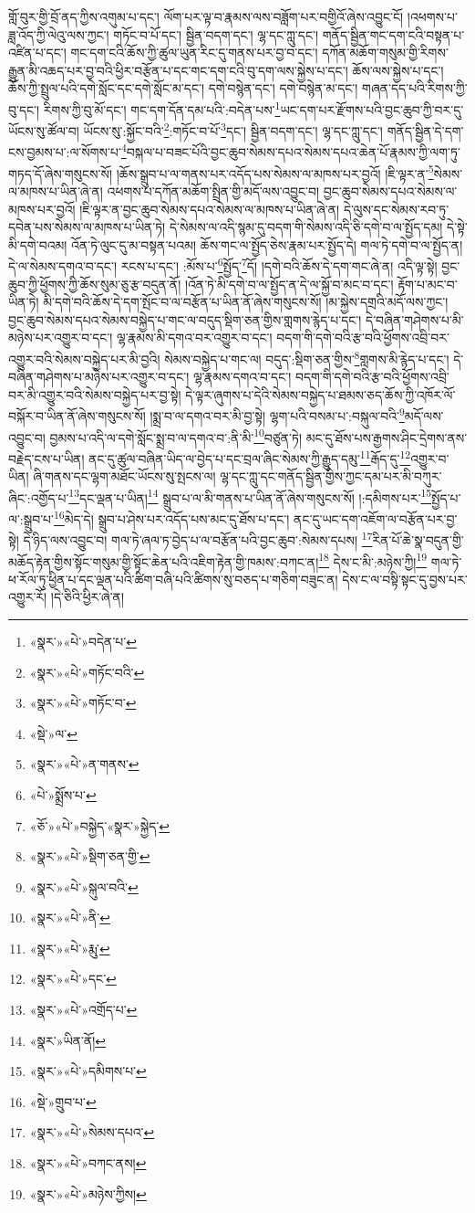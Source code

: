 གློ་བུར་གྱི་བྲོ་ནད་ཀྱིས་འགུམ་པ་དང་། ལོག་པར་ལྟ་བ་རྣམས་ལས་བཟློག་པར་བགྱིའོ་ཞེས་འབྱུང་ངོ། །འཕགས་པ་ཟླ་འོད་ཀྱི་ལེའུ་ལས་ཀྱང་། གཏོང་བ་པོ་དང་། སྦྱིན་བདག་དང་། ལྷ་དང་ཀླུ་དང་། གནོད་སྦྱིན་གང་དག་ངའི་བསྟན་པ་འཛིན་པ་དང་། གང་དག་ངའི་ཆོས་ཀྱི་ཚུལ་ཡུན་རིང་དུ་གནས་པར་བྱ་བ་དང་། དཀོན་མཆོག་གསུམ་གྱི་རིགས་རྒྱུན་མི་འཆད་པར་བྱ་བའི་ཕྱིར་བརྩོན་པ་དང་གང་དག་ངའི་བུ་དག་ལས་སྐྱེས་པ་དང་། ཆོས་ལས་སྐྱེས་པ་དང་། ཆོས་ཀྱི་སྤྲུལ་པའི་དགེ་སློང་དང་དགེ་སློང་མ་དང་། དགེ་བསྙེན་དང་། དགེ་བསྙེན་མ་དང་། གཞན་དད་པའི་རིགས་ཀྱི་བུ་དང་། རིགས་ཀྱི་བུ་མོ་དང་། གང་དག་དོན་དམ་པའི་:བདེན་པས་\footnote{«སྣར་»«པེ་»བདེན་པ་}ཡང་དག་པར་རྫོགས་པའི་བྱང་ཆུབ་ཀྱི་བར་དུ་ཡོངས་སུ་ཚོལ་བ། ཡོངས་སུ་:སྐྱོང་བའི་\footnote{«སྣར་»«པེ་»གཏོང་བའི་}:གཏོང་བ་པོ་\footnote{«སྣར་»«པེ་»གཏོང་བ་}དང་། སྦྱིན་བདག་དང་། ལྷ་དང་ཀླུ་དང་། གནོད་སྦྱིན་དེ་དག་ངས་བྱམས་པ་:ལ་སོགས་པ་\footnote{«སྡེ་»ལ་}བསྐལ་པ་བཟང་པོའི་བྱང་ཆུབ་སེམས་དཔའ་སེམས་དཔའ་ཆེན་པོ་རྣམས་ཀྱི་ལག་ཏུ་གཏད་དོ་ཞེས་གསུངས་སོ། །ཆོས་སྒྲུབ་པ་ལ་གནས་པར་འདོད་པས་སེམས་ལ་མཁས་པར་བྱའོ། །ཇི་ལྟར་ན་\footnote{«སྣར་»«པེ་»ན་གནས་}སེམས་ལ་མཁས་པ་ཡིན་ཞེ་ན། འཕགས་པ་དཀོན་མཆོག་སྤྲིན་གྱི་མདོ་ལས་འབྱུང་བ། བྱང་ཆུབ་སེམས་དཔའ་སེམས་ལ་མཁས་པར་བྱའོ། །ཇི་ལྟར་ན་བྱང་ཆུབ་སེམས་དཔའ་སེམས་ལ་མཁས་པ་ཡིན་ཞེ་ན། དེ་ལུས་དང་སེམས་རབ་ཏུ་དབེན་པས་སེམས་ལ་མཁས་པ་ཡིན་ཏེ། དེ་སེམས་ལ་འདི་སྙམ་དུ་བདག་གི་སེམས་འདི་ཅི་དགེ་བ་ལ་སྤྱོད་དམ། དེ་སྟེ་མི་དགེ་བའམ། འོན་ཏེ་ལུང་དུ་མ་བསྟན་པའམ། ཆོས་གང་ལ་སྤྱོད་ཅེས་རྣམ་པར་སྤྱོད་དེ། གལ་ཏེ་དགེ་བ་ལ་སྤྱོད་ན། དེ་ལ་སེམས་དགའ་བ་དང་། རངས་པ་དང་། :མོས་པ་\footnote{«པེ་»སྨྲོས་པ་}སྤྱོད་\footnote{«ཅོ་»«པེ་»བསྐྱེད་«སྣར་»སྐྱེད་}དོ། །དགེ་བའི་ཆོས་དེ་དག་གང་ཞེ་ན། འདི་ལྟ་སྟེ། བྱང་ཆུབ་ཀྱི་ཕྱོགས་ཀྱི་ཆོས་སུམ་ཅུ་རྩ་བདུན་ནོ། །འོན་ཏེ་མི་དགེ་བ་ལ་སྤྱོད་ན་དེ་ལ་སྐྱོ་བ་མང་བ་དང་། རྟོག་པ་མང་བ་ཡིན་ཏེ། མི་དགེ་བའི་ཆོས་དེ་དག་སྤོང་བ་ལ་བརྩོན་པ་ཡིན་ནོ་ཞེས་གསུངས་སོ། །མ་སྐྱེས་དགྲའི་མདོ་ལས་ཀྱང་། བྱང་ཆུབ་སེམས་དཔའ་སེམས་བསྐྱེད་པ་གང་ལ་བདུད་སྡིག་ཅན་གྱིས་གླགས་རྙེད་པ་དང་། དེ་བཞིན་གཤེགས་པ་མི་མཉེས་པར་འགྱུར་བ་དང་། ལྷ་རྣམས་མི་དགའ་བར་འགྱུར་བ་དང་། བདག་གི་དགེ་བའི་རྩ་བའི་ཕྱོགས་འབྲི་བར་འགྱུར་བའི་སེམས་བསྐྱེད་པར་མི་བྱའི། སེམས་བསྐྱེད་པ་གང་ལ། བདུད་:སྡིག་ཅན་གྱིས་\footnote{«སྣར་»«པེ་»སྡིག་ཅན་གྱི་}གླགས་མི་རྙེད་པ་དང་། དེ་བཞིན་གཤེགས་པ་མཉེས་པར་འགྱུར་བ་དང་། ལྷ་རྣམས་དགའ་བ་དང་། བདག་གི་དགེ་བའི་རྩ་བའི་ཕྱོགས་འབྲི་བར་མི་འགྱུར་བའི་སེམས་བསྐྱེད་པར་བྱ་སྟེ། དེ་ལྟར་ཞུགས་པ་དེའི་སེམས་བསྐྱེད་པ་ཐམས་ཅད་ཆོས་ཀྱི་འཁོར་ལོ་བསྐོར་བ་ཡིན་ནོ་ཞེས་གསུངས་སོ། །སྨྲ་བ་ལ་དགའ་བར་མི་བྱ་སྟེ། ལྷག་པའི་བསམ་པ་:བསྐུལ་བའི་\footnote{«སྣར་»«པེ་»སྐུལ་བའི་}མདོ་ལས་འབྱུང་བ། བྱམས་པ་འདི་ལ་དགེ་སློང་སྨྲ་བ་ལ་དགའ་བ་:ནི་མི་\footnote{«སྣར་»«པེ་»ནི་}བཙུན་ཏེ། མང་དུ་ཐོས་པས་རྒྱགས་ཤིང་དྲེགས་ནས་བརྗེད་ངས་པ་ཡིན། ནང་དུ་ཚུལ་བཞིན་ཡིད་ལ་བྱེད་པ་དང་བྲལ་ཞིང་སེམས་ཀྱི་རྒྱུད་དམུ་\footnote{«སྣར་»«པེ་»རྨུ་}རྒོད་དུ་\footnote{«སྣར་»«པེ་»དང་}འགྱུར་བ་ཡིན། ཞི་གནས་དང་ལྷག་མཐོང་ཡོངས་སུ་སྤངས་ལ། ལྷ་དང་ཀླུ་དང་གནོད་སྦྱིན་གྱིས་ཀྱང་དམ་པར་མི་བཀུར་ཞིང་:འགྱོད་པ་\footnote{«སྣར་»«པེ་»འགྲོད་པ་}དང་ལྡན་པ་ཡིན།\footnote{«སྣར་»ཡིན་ནོ།} སྒྲུབ་པ་ལ་མི་གནས་པ་ཡིན་ནོ་ཞེས་གསུངས་སོ། །:དམིགས་པར་\footnote{«སྣར་»«པེ་»དམིགས་པ་}སྤྱོད་པ་ལ་:སྒྲུབ་པ་\footnote{«སྡེ་»གྲུབ་པ་}མེད་དེ། སྒྲུབ་པ་ཤེས་པར་འདོད་པས་མང་དུ་ཐོས་པ་དང་། ནང་དུ་ཡང་དག་འཇོག་ལ་བརྩོན་པར་བྱ་སྟེ། དེ་ཉིད་ལས་འབྱུང་བ། གལ་ཏེ་ཞལ་ཏ་བྱེད་པ་ལ་བརྩོན་པའི་བྱང་ཆུབ་:སེམས་དཔས། \footnote{«སྣར་»«པེ་»སེམས་དཔའ་}རིན་པོ་ཆེ་སྣ་བདུན་གྱི་མཆོད་རྟེན་གྱིས་སྟོང་གསུམ་གྱི་སྟོང་ཆེན་པའི་འཇིག་རྟེན་གྱི་ཁམས་:བཀང་ན།\footnote{«སྣར་»«པེ་»བཀང་ནས།} དེས་ང་མི་:མཉེས་ཀྱི།\footnote{«སྣར་»«པེ་»མཉེས་ཀྱིས།} གལ་ཏེ་ཕ་རོལ་ཏུ་ཕྱིན་པ་དང་ལྡན་པའི་ཚིག་བཞི་པའི་ཚིགས་སུ་བཅད་པ་གཅིག་བཟུང་ན། དེས་ང་ལ་བསྟི་སྟང་དུ་བྱས་པར་འགྱུར་རོ། །དེ་ཅིའི་ཕྱིར་ཞེ་ན། 